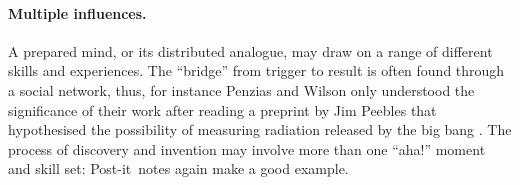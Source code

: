 \paragraph{Multiple influences.}

A prepared mind, or its distributed analogue, may draw on a range of
different skills and experiences.  The ``bridge'' from trigger to
result is often found through a social network, thus, for instance
Penzias and Wilson only understood the significance of their work
after reading a preprint by Jim Peebles that hypothesised the
possibility of measuring radiation released by the big bang
\cite{wiki:cosmic-radiation}.
%
The process of discovery and invention may involve more than one
``aha!'' moment and skill set: Post-it\texttrademark\ notes again make
a good example.

